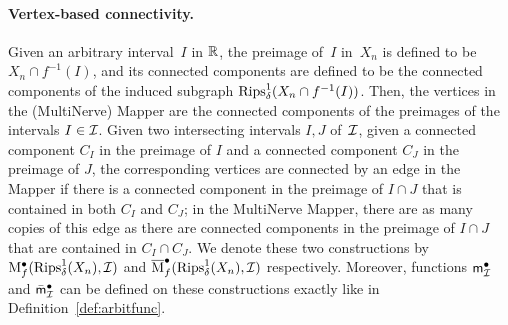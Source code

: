 \paragraph*{Vertex-based connectivity.}

Given an arbitrary interval~$I$ in $\mathbb{R}$, the preimage of~$I$ in~$X_n$ is
defined to be $X_n\cap f^{-1}(I)$, and its connected components are defined to be the connected components of the
induced subgraph $\mathrm{Rips}^1_\delta(X_n\cap f^{-1}(I))$. Then, the
vertices in the (MultiNerve) Mapper are the connected components of the preimages of the
intervals $I\in \mathcal{I}$. Given two intersecting intervals $I,J$ of~$\mathcal{I}$,
given a connected component $C_I$ in the preimage of $I$ and a connected component $C_J$ in the preimage
of $J$, the corresponding vertices are connected by an edge in the Mapper if
there is a connected component in the preimage of $I\cap J$ that is contained in both
$C_I$ and $C_J$; in the MultiNerve Mapper, there are as many copies of
this edge as there are connected components in the preimage of $I\cap J$ that are
contained in $C_I\cap C_J$. We denote these two constructions by 
${\rm M}^\bullet_f(\mathrm{Rips}^1_\delta(X_n), \mathcal{I})$ and $\overline{\rm M}^\bullet_f(\mathrm{Rips}^1_\delta(X_n), \mathcal{I})$ respectively.
Moreover, functions ${\sf m}_{\mathcal I}^\bullet$ and $\bar {\sf{m}}_{\mathcal I}^\bullet$ can be defined on these constructions
exactly like in Definition~\ref{def:arbitfunc}.



   


